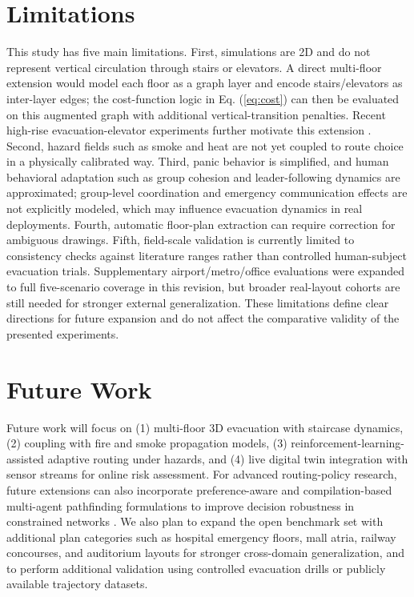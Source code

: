 \documentclass[nolineno]{ieeeaccess}
\begin{document}
\section{Limitations}
This study has five main limitations. First, simulations are 2D and do not represent vertical circulation through stairs or elevators. A direct multi-floor extension would model each floor as a graph layer and encode stairs/elevators as inter-layer edges; the cost-function logic in Eq. (\ref{eq:cost}) can then be evaluated on this augmented graph with additional vertical-transition penalties. Recent high-rise evacuation-elevator experiments further motivate this extension \cite{mossberg2020elevator}. Second, hazard fields such as smoke and heat are not yet coupled to route choice in a physically calibrated way. Third, panic behavior is simplified, and human behavioral adaptation such as group cohesion and leader-following dynamics are approximated; group-level coordination and emergency communication effects are not explicitly modeled, which may influence evacuation dynamics in real deployments. Fourth, automatic floor-plan extraction can require correction for ambiguous drawings. Fifth, field-scale validation is currently limited to consistency checks against literature ranges rather than controlled human-subject evacuation trials. Supplementary airport/metro/office evaluations were expanded to full five-scenario coverage in this revision, but broader real-layout cohorts are still needed for stronger external generalization. These limitations define clear directions for future expansion and do not affect the comparative validity of the presented experiments.

\section{Future Work}
Future work will focus on (1) multi-floor 3D evacuation with staircase dynamics, (2) coupling with fire and smoke propagation models, (3) reinforcement-learning-assisted adaptive routing under hazards, and (4) live digital twin integration with sensor streams for online risk assessment. For advanced routing-policy research, future extensions can also incorporate preference-aware and compilation-based multi-agent pathfinding formulations to improve decision robustness in constrained networks \cite{ho2022mapfpref,surynek2022mapfsurvey}. We also plan to expand the open benchmark set with additional plan categories such as hospital emergency floors, mall atria, railway concourses, and auditorium layouts for stronger cross-domain generalization, and to perform additional validation using controlled evacuation drills or publicly available trajectory datasets.
\end{document}
